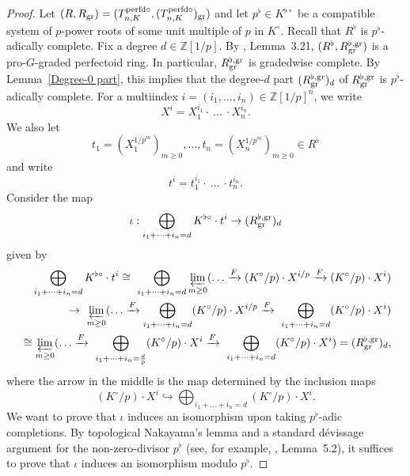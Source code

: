 \documentclass[12pt,twoside,a4paper]{article}
\theoremstyle{definition}
\theoremstyle{remark}
\newcommand\gr{{\rm gr}}
\newcommand\perfd{{\rm perfd}}
\begin{document}
\begin{proof}Let $(R, R_{\gr})=(T_{n, K}^{\perfd\circ}, (T_{n, K}^{\perfd\circ})_{\gr})$ and let $p^{\flat}\in K^{\flat\circ}$ be a compatible system of $p$-power roots of some unit multiple of $p$ in $K^{\circ}$. Recall that $R^{\flat}$ is $p^{\flat}$-adically complete. Fix a degree $d\in \mathbb{Z}[1/p]$. By \cite{Ishizuka-Yoshikawa25}, Lemma~3.21, $(R^{\flat}, R_{\gr}^{\flat,\gr})$ is a pro-$G$-graded perfectoid ring. In particular, $R_{\gr}^{\flat,\gr}$ is gradedwise complete. By Lemma~\ref{Degree-0 part}, this implies that the degree-$d$ part $(R_{\gr}^{\flat,\gr})_{d}$ of $R_{\gr}^{\flat,\gr}$ is $p^{\flat}$-adically complete. For a multiindex $i=(i_1,\dots, i_n)\in \mathbb{Z}[1/p]^{n}$, we write \begin{equation*}X^{i}=X_{1}^{i_{1}}\cdot~\dots~\cdot X_{n}^{i_{n}}.\end{equation*}We also let \begin{equation*}t_{1}=(X_{1}^{1/p^{m}})_{m\geq0},\dots, t_{n}=(X_{n}^{1/p^{m}})_{m\geq0}\in R^{\flat}\end{equation*}and write \begin{equation*}t^{i}=t_{1}^{i_{1}}\cdot~\dots~\cdot t_{n}^{i_{n}}.\end{equation*}Consider the map \begin{equation*}\iota: \bigoplus_{i_1+\dots+i_{n}=d}K^{\flat\circ}\cdot t^{i}\to (R_{\gr}^{\flat,\gr})_{d}\end{equation*}given by \begin{align*}\bigoplus_{i_1+\dots+i_{n}=d}K^{\flat\circ}\cdot t^{i}\cong \bigoplus_{i_{1}+\dots+i_{n}=d}\varprojlim_{m\geq0} ( \dots \xrightarrow{F} (K^{\circ}/p)\cdot X^{i/p} \xrightarrow{F} (K^{\circ}/p)\cdot X^{i}) \\\to \varprojlim_{m\geq0}(\dots \xrightarrow{F}\bigoplus_{i_1+\dots+i_n=d}(K^{\circ}/p)\cdot X^{i/p}\xrightarrow{F} \bigoplus_{i_1+\dots+i_n=d}(K^{\circ}/p)\cdot X^{i}) \\ \cong \varprojlim_{m\geq0}(\dots \xrightarrow{F} \bigoplus_{i_1+\dots+i_n=\frac{d}{p}}(K^{\circ}/p) \cdot X^{i} \xrightarrow{F} \bigoplus_{i_1+\dots+i_n=d}(K^{\circ}/p) \cdot X^{i})=(R_{\gr}^{\flat,\gr})_{d}, \end{align*}where the arrow in the middle is the map determined by the inclusion maps \begin{equation*}(K^{\circ}/p)\cdot X^{i}\hookrightarrow \bigoplus_{i_{1}+\dots+i_{n}=d}(K^{\circ}/p)\cdot X^{i}.\end{equation*}We want to prove that $\iota$ induces an isomorphism upon taking $p^{\flat}$-adic completions. By topological Nakayama's lemma and a standard dévissage argument for the non-zero-divisor $p^{\flat}$ (see, for example, \cite{Dine25-3}, Lemma~5.2), it suffices to prove that $\iota$ induces an isomorphism modulo $p^{\flat}$. 


\end{proof}
\end{document}
